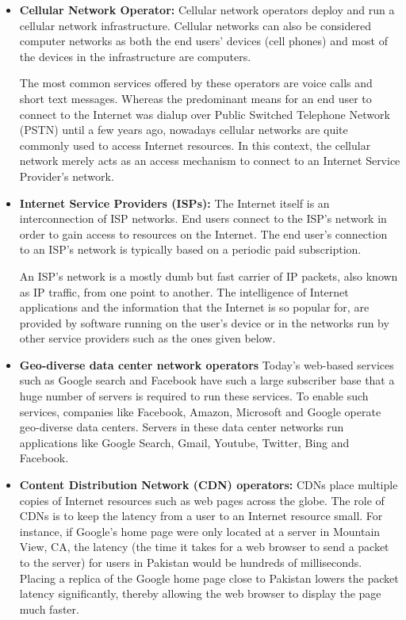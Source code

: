\begin{itemize}
\item \textbf{Cellular Network Operator:} Cellular network operators deploy and run a cellular network infrastructure. Cellular networks can also be considered computer networks as both the end users' devices (cell phones) and most of the devices in the infrastructure are computers. 

The most common services offered by these operators are voice calls and short text messages. Whereas the predominant means for an end user to connect to the Internet was dialup over Public Switched Telephone Network (PSTN) until a few years ago, nowadays cellular networks are quite commonly used to access Internet resources. In this context, the cellular network merely acts as an access mechanism to connect to an Internet Service Provider's network.


\item \textbf{Internet Service Providers (ISPs):} The Internet itself is an interconnection of ISP networks. End users connect to the ISP's network in order to gain access to resources on the Internet. The end user's connection to an ISP's network is typically based on a periodic paid subscription. 

An ISP's network is a mostly dumb but fast carrier of IP packets, also known as IP traffic, from one point to another. The intelligence of Internet applications and the information that the Internet is so popular for, are provided by software running on the user's device or in the networks run by other service providers such as the ones given below.
\item \textbf{Geo-diverse data center network operators} Today's web-based services such as Google search and Facebook have such a large subscriber base that a huge number of servers is required to run these services. To enable such services, companies like Facebook, Amazon, Microsoft and Google operate geo-diverse data centers. Servers in these data center networks run applications like Google Search, Gmail, Youtube, Twitter, Bing and Facebook.
\item \textbf{Content Distribution Network (CDN) operators:} CDNs place multiple copies of Internet resources such as web pages across the globe. The role of CDNs is to keep the latency from a user to an Internet resource small. For instance, if Google's home page were only located at a server in Mountain View, CA, the latency (the time it takes for a web browser to send a packet to the server) for users in Pakistan would be hundreds of milliseconds. Placing a replica of the Google home page close to Pakistan lowers the packet latency significantly, thereby allowing the web browser to display the page much faster.
\end{itemize}



